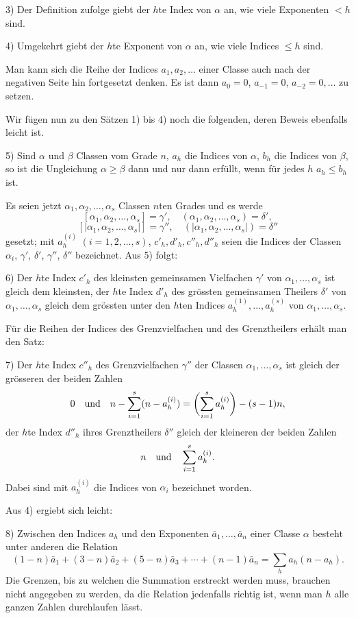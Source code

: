 \documentclass[11pt,a4paper]{article}
\begin{document}
3) Der Definition zufolge giebt der $h$te Index von $\alpha$ an, wie viele Exponenten $<h$ sind.

4) Umgekehrt giebt der $h$te Exponent von $\alpha$ an, wie viele Indices $\le h$ sind.

Man kann sich die Reihe der Indices $a_1,a_2,\ldots$ einer Classe auch nach der negativen Seite hin fortgesetzt denken. Es ist dann $a_0=0$, $a_{-1}=0$, $a_{-2}=0,\ldots$ zu setzen.

Wir fügen nun zu den Sätzen 1) bis 4) noch die folgenden, deren Beweis ebenfalls leicht ist.

5) Sind $\alpha$ und $\beta$ Classen vom Grade $n$, $a_h$ die Indices von $\alpha$, $b_h$ die Indices von $\beta$, so ist die Ungleichung $\alpha\ge\beta$ dann und nur dann erfüllt, wenn für jedes $h$ $a_h\le b_h$ ist.

Es seien jetzt $\alpha_1,\alpha_2,\ldots,\alpha_s$ Classen $n$ten Grades und es werde
\[
 [\alpha_1,\alpha_2,\ldots,\alpha_s]=\gamma',\quad
 (\alpha_1,\alpha_2,\ldots,\alpha_s)=\delta',
\]
\[
 [|\alpha_1,\alpha_2,\ldots,\alpha_s|]=\gamma'',\quad
 (|\alpha_1,\alpha_2,\ldots,\alpha_s|)=\delta''
\]
gesetzt; mit $a_h^{(i)}$ $(i=1,2,\ldots,s)$, $c'_h,d'_h,c''_h,d''_h$ seien die Indices der Classen $\alpha_i$, $\gamma'$, $\delta'$, $\gamma''$, $\delta''$ bezeichnet. Aus 5) folgt:

6) Der $h$te Index $c'_h$ des kleinsten gemeinsamen Vielfachen $\gamma'$ von $\alpha_1,\ldots,\alpha_s$ ist gleich dem kleinsten, der $h$te Index $d'_h$ des grössten gemeinsamen Theilers $\delta'$ von $\alpha_1,\ldots,\alpha_s$ gleich dem grössten unter den $h$ten Indices $a_h^{(1)},\ldots,a_h^{(s)}$ von $\alpha_1,\ldots,\alpha_s$.

Für die Reihen der Indices des Grenzvielfachen und des Grenztheilers erhält man den Satz:

7) Der $h$te Index $c''_h$ des Grenzvielfachen $\gamma''$ der Classen $\alpha_1,\ldots,\alpha_s$ ist gleich der grösseren der beiden Zahlen
\[
 0\quad\hbox{und}\quad n-\sum_{i=1}^s(n-a_h^{(i)})=\biggl(\sum_{i=1}^s a_h^{(i)}\biggr)-(s-1)n,
\]
der $h$te Index $d''_h$ ihres Grenztheilers $\delta''$ gleich der kleineren der beiden Zahlen
\[
 n\quad\hbox{und}\quad \sum_{i=1}^s a_h^{(i)}.
\]
Dabei sind mit $a_h^{(i)}$ die Indices von $\alpha_i$ bezeichnet worden.

Aus 4) ergiebt sich leicht:

8) Zwischen den Indices $a_h$ und den Exponenten $\bar a_1,\ldots,\bar a_n$ einer Classe $\alpha$ besteht unter anderen die Relation
\begin{equation}
 (1-n)\bar a_1+(3-n)\bar a_2+(5-n)\bar a_3+\cdots+(n-1)\bar a_n
 =\sum_h a_h(n-a_h).
\tag{3}
\end{equation}
Die Grenzen, bis zu welchen die Summation erstreckt werden muss, brauchen nicht angegeben zu werden, da die Relation jedenfalls richtig ist, wenn man $h$ alle ganzen Zahlen durchlaufen lässt.
\end{document}
